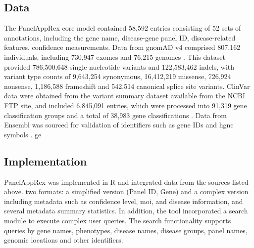 \subsection{Data}
The PanelAppRex core model contained 58,592 entries consisting of 52 sets of annotations, including the gene name, disease-gene panel ID, disease-related features, confidence measurements.
\DIFdelbegin {}%
\DIFdelend Data from gnomAD v4 comprised 807,162 individuals, including 730,947 exomes and 76,215 genomes \cite{karczewski2020mutational}. This dataset provided 786,500,648 single nucleotide variants and 122,583,462 indels, with variant type counts of 9,643,254 synonymous, 16,412,219 missense, 726,924 nonsense, 1,186,588 frameshift and 542,514 canonical splice site variants. ClinVar data were obtained from the variant summary dataset 
 available from the NCBI FTP site, and included 6,845,091 entries, which were processed into 91,319 gene classification groups and a total of 38,983 gene classifications 
\cite{landrum_clinvar_2018}. 
Data from Ensembl was sourced for validation of identifiers such as \DIFdelbegin %
\DIFdelend gene IDs and \ac{hgnc} symbols
\cite{dyer_ensembl_2025}.
\DIFaddbegin {}\ac{ge}\DIFaddend %

\subsection{Implementation}
\noindent
PanelAppRex was implemented in R and integrated data from the sources listed above.
\DIFdelbegin {}\DIFdelend \DIFaddbegin {}\DIFaddend two formats: a simplified version (Panel ID, Gene) and a complex version including metadata such as confidence level, \ac{moi}, and disease information, and several metadata summary statistics. In addition, the tool incorporated a search module to execute complex user queries. The search functionality supports queries by gene names, phenotypes, disease names, disease groups, panel names, genomic locations and other identifiers. 
\DIFdelbegin %
\DIFdelend 

